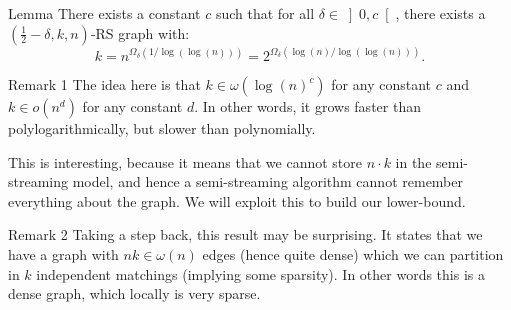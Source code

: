 \documentclass[a4paper]{article}
\begin{document}
\begin{parag}{Lemma}
    There exists a constant $c$ such that for all $\delta \in \left]0, c\right[ $, there exists a $\left(\frac{1}{2} - \delta, k, n\right)$-RS graph with:
    \[k = n^{\Omega_{\delta}\left(1/\log\left(\log\left(n\right)\right)\right)}= 2^{\Omega_{\delta}\left(\log\left(n\right)/\log\left(\log\left(n\right)\right)\right)}.\]

    \begin{subparag}{Remark 1}
        The idea here is that $k \in \omega\left(\log\left(n\right)^c\right)$ for any constant $c$ and $k \in o\left(n^d\right)$ for any constant $d$. In other words, it grows faster than polylogarithmically, but slower than polynomially.

        This is interesting, because it means that we cannot store $n\cdot k$ in the semi-streaming model, and hence a semi-streaming algorithm cannot remember everything about the graph. We will exploit this to build our lower-bound.
    \end{subparag}

    \begin{subparag}{Remark 2}
        Taking a step back, this result may be surprising. It states that we have a graph with $n k \in \omega\left(n\right)$ edges (hence quite dense) which we can partition in $k$ independent matchings (implying some sparsity). In other words this is a dense graph, which locally is very sparse.
    \end{subparag}
\end{parag}
\end{document}
